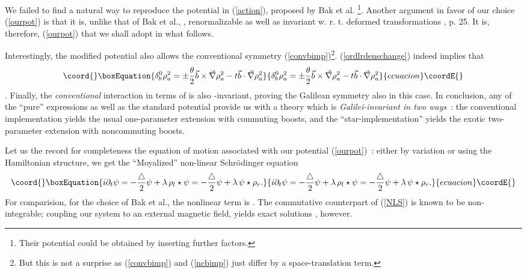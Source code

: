\documentclass[a4paper,11pt]{article}
\def\p{{\partial}}
\def\vb{{\vec b}}
\def\vnabla{{\vec\nabla}}
\begin{document}
We failed to find a natural way to reproduce the potential
\coordHE{}
in (\ref{action}),
proposed by Bak et al.  \cite{Baketal}\footnote{Their potential
could be obtained by inserting further \myHighlight{$\delta$}\coordHE{} factors.}.
Another argument in favor of our choice (\ref{ourpot})
is that it is, unlike that of Bak et al., \coordHE{}, renormalizable
as well as invariant w. r. t. deformed
\coordHE{} transformations \cite{Arefeva}, p. 25.
It is, therefore, (\ref{ourpot}) that we shall adopt in what follows.

Interestingly, the modified potential \coordHE{} also
allows the conventional symmetry (\ref{convbimp})\footnote{
But this is not a surprise as (\ref{convbimp}) and (\ref{ncbimp}) just
differ by a space-translation term.}.
(\ref{ordlrdenschange})  indeed implies that
\begin{equation}\coord{}\boxEquation{
     \delta^0_{b}\rho_{a}^2=
     \pm\frac{\theta}{2}\vb\times\vnabla\rho_{a}^2
     -t\vb\cdot\vnabla\rho_{a}^2
}{
     \delta^0_{b}\rho_{a}^2=
     \pm\frac{\theta}{2}\vb\times\vnabla\rho_{a}^2
     -t\vb\cdot\vnabla\rho_{a}^2
}{ecuacion}\coordE{}\end{equation}
\coordHE{}. Finally, the {\it conventional} interaction
in terms of  \myHighlight{$\rho$}\coordHE{} is also \myHighlight{$\delta^*$}\coordHE{}-invariant,
proving the Galilean symmetry also in this case.
In conclusion, any of the ``pure'' expressions
\coordHE{}
as well as the standard potential \coordHE{}
provide us with a theory which is {\it Galilei-invariant in two ways}~:
the conventional implementation yields the usual one-parameter
extension with commuting boosts, and
the ``star-implementation'' yields the  exotic two-parameter
extension with noncommuting boosts.

Let us the record for completeness the equation of motion
associated with our potential (\ref{ourpot})~: either by variation or
using the Hamiltonian structure, we get the ``Moyalized'' non-linear
Schr\"odinger equation
\begin{equation}\coord{}\boxEquation{
i\p_{t}\psi=-\frac{\bigtriangleup}{2}\psi
+\lambda\,\rho_{l}\star\psi=
-\frac{\bigtriangleup}{2}\psi
+\lambda\,\psi\star\rho_{r}.
\label{NLS}
}{
i\p_{t}\psi=-\frac{\bigtriangleup}{2}\psi
+\lambda\,\rho_{l}\star\psi=
-\frac{\bigtriangleup}{2}\psi
+\lambda\,\psi\star\rho_{r}.
}{ecuacion}\coordE{}\end{equation}
For comparision, for the choice \coordHE{} of Bak et al.,
the nonlinear term is
\coordHE{}.
The commutative counterpart of (\ref{NLS}) is known to be
non-integrable; coupling our system to an external magnetic field,
yields exact solutions \cite{Langmann}, however.
\end{document}
